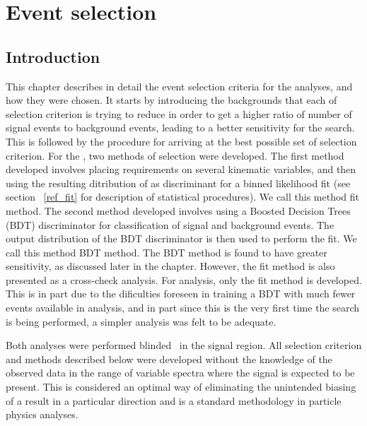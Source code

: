 \chapter{Event selection}
\label{evt_sel}
\section{Introduction}
\label{evt_sel_intro}
This chapter describes in detail the event selection criteria for the analyses, and how they were chosen. It starts by introducing the backgrounds that each of selection criterion is trying to reduce in order to get a higher ratio of number of signal events to background events, leading to a better sensitivity for the search. This is followed by the procedure for arriving at the best possible set of selection criterion. For the \hmue, two methods of selection were developed. The first method developed involves placing requirements on several kinematic variables, and then using the resulting ditribution of \mcol as discriminant for a binned likelihood fit (see section ~\ref{ref_fit} for description of statistical procedures). We call this method \mcol fit method. The second method developed involves using a Boosted Decision Trees (BDT) discriminator  for classification of signal and background events. The output distribution of the BDT discriminator is then used to perform the fit. We call this method BDT method. The BDT method is found to have greater sensitivity, as discussed later in the chapter. However, the \mcol fit method is also presented as a cross-check analysis. For \Hmue analysis, only the \mcol fit method is developed. This is in part due to the dificulties foreseen in training a BDT with much fewer events available in \Hmue analysis, and in part since this is the very first time the \Hmue search is being performed, a simpler analysis was felt to be adequate.  

Both analyses were performed blinded~\cite{blind_analysis} in the signal region. All selection criterion and methods described below were developed without the knowledge of the observed data in the range of variable spectra where the signal is expected to be present. This is considered an optimal way of eliminating the unintended biasing of a result in a particular direction and is a standard methodology in particle physics analyses.

